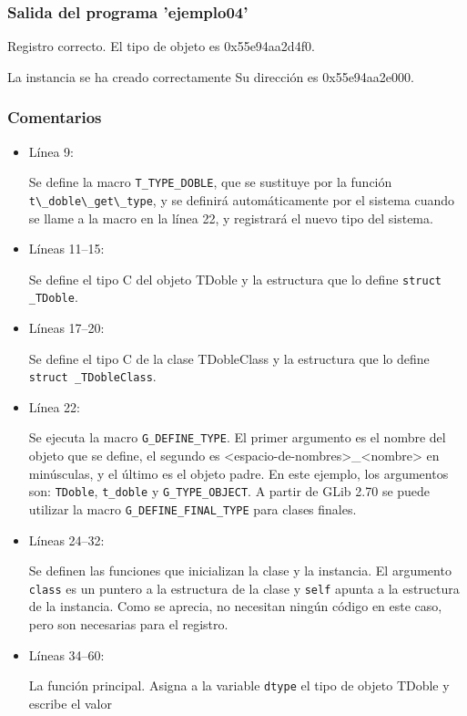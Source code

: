  \subsubsection{Salida del programa 'ejemplo04'}
\textsf{Registro correcto. El tipo de objeto es 0x55e94aa2d4f0.}\par
\textsf{La instancia se ha creado correctamente Su dirección es 0x55e94aa2e000.}\par

\subsubsection{Comentarios}
\begin{itemize}
\item Línea 9:\par
  Se define la macro \texttt{T\_TYPE\_DOBLE}, que se sustituye por la función
  \passthrough{\lstinline!t\_doble\_get\_type!}, y se definirá automáticamente por el sistema cuando
  se llame a la macro en la línea 22, y registrará el nuevo tipo del sistema.
\item Líneas 11--15:\par
  Se define el tipo C del objeto \textsf{TDoble} y la estructura que lo define \texttt{struct \_TDoble}.
\item Líneas 17--20:\par
  Se define el tipo C de la clase \textsf{TDobleClass} y la estructura que lo define \texttt{struct \_TDobleClass}.
\item Línea 22:\par
  Se ejecuta la macro \texttt{G\_DEFINE\_TYPE}. El primer argumento es el nombre del objeto que se define,
  el segundo es \textsf{<espacio-de-nombres>\_<nombre>} en minúsculas, y el último es el objeto padre.
  En este ejemplo, los argumentos son: \texttt{TDoble}, \texttt{t\_doble} y \texttt{G\_TYPE\_OBJECT}.
  A partir de \textsf{GLib 2.70} se puede utilizar la macro \texttt{G\_DEFINE\_FINAL\_TYPE} para clases finales.
\item Líneas 24--32:\par
  Se definen las funciones que inicializan la clase y la instancia. El argumento \texttt{class} es un puntero a la
  estructura de la clase y \texttt{self} apunta a la estructura de la instancia. Como se aprecia, no
  necesitan ningún código en este caso, pero son necesarias para el registro.
\item Líneas 34--60:\par
  La función principal. Asigna a la variable \texttt{dtype} el tipo de objeto \textsf{TDoble} y escribe el valor

\end{itemize}
